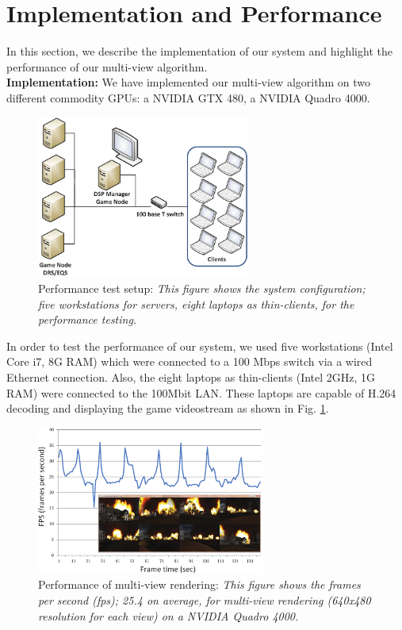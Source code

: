 \documentclass[conference]{IEEEtran}
\begin{document}
    \section{Implementation and Performance}
    \label{sc:Implementation}
    In this section, we describe the implementation of our system and highlight the performance of our multi-view algorithm.\\

    \noindent
    \textbf{Implementation:} We have implemented our multi-view algorithm on two different commodity GPUs: a NVIDIA GTX 480, a NVIDIA Quadro 4000.
    \begin{figure}[htb] %
    \centering
    \includegraphics[width=7cm, keepaspectratio]{testenv}
    \caption{Performance test setup: \emph{This figure shows the system configuration; five workstations for servers, eight laptops as thin-clients, for the performance testing.}}
    \label{fig:testenv}
    \end{figure}
    In order to test the performance of our system, we used five workstations (Intel Core i7, 8G RAM) which were connected to a 100 Mbps switch via a wired Ethernet connection. Also, the eight laptops as thin-clients (Intel 2GHz, 1G RAM) were connected to the 100Mbit LAN. These laptops are capable of H.264 decoding and displaying the game videostream as shown in Fig. \ref{fig:testenv}.

    \begin{figure}[htb] %
    \centering
    \includegraphics[width=7.5cm, keepaspectratio]{performancegraph}
    \caption{Performance of multi-view rendering: \emph{This figure shows the frames per second (fps); 25.4 on average, for multi-view rendering (640x480 resolution for each view) on a NVIDIA Quadro 4000.}}
    \label{fig:graph}
    \end{figure}
\end{document}
